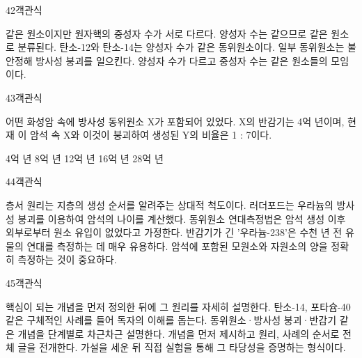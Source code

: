 \documentclass[fs9,seriesRus]{korfarm-base}
\begin{document}
\begin{kfQBlock}{42}{객관식}
\begin{kfChoices}
\kfChoice 같은 원소이지만 원자핵의 중성자 수가 서로 다르다.
\kfChoice 양성자 수는 같으므로 같은 원소로 분류된다.
\kfChoice 탄소-12와 탄소-14는 양성자 수가 같은 동위원소이다.
\kfChoice 일부 동위원소는 불안정해 방사성 붕괴를 일으킨다.
\kfChoice 양성자 수가 다르고 중성자 수는 같은 원소들의 모임이다.
\end{kfChoices}
\end{kfQBlock}
\begin{kfQBlock}{43}{객관식}
\begin{kfEvidence}어떤 화성암 속에 방사성 동위원소 X가 포함되어 있었다. X의 반감기는 4억 년이며, 현재 이 암석 속 X와 이것이 붕괴하여 생성된 Y의 비율은 1 : 7이다.\end{kfEvidence}
\begin{kfChoices}
\kfChoice 4억 년
\kfChoice 8억 년
\kfChoice 12억 년
\kfChoice 16억 년
\kfChoice 28억 년
\end{kfChoices}
\end{kfQBlock}
\begin{kfQBlock}{44}{객관식}
\begin{kfChoices}
\kfChoice 층서 원리는 지층의 생성 순서를 알려주는 상대적 척도이다.
\kfChoice 러더포드는 우라늄의 방사성 붕괴를 이용하여 암석의 나이를 계산했다.
\kfChoice 동위원소 연대측정법은 암석 생성 이후 외부로부터 원소 유입이 없었다고 가정한다.
\kfChoice 반감기가 긴 '우라늄-238'은 수천 년 전 유물의 연대를 측정하는 데 매우 유용하다.
\kfChoice 암석에 포함된 모원소와 자원소의 양을 정확히 측정하는 것이 중요하다.
\end{kfChoices}
\end{kfQBlock}
\begin{kfQBlock}{45}{객관식}
\begin{kfChoices}
\kfChoice 핵심이 되는 개념을 먼저 정의한 뒤에 그 원리를 자세히 설명한다.
\kfChoice 탄소-14, 포타슘-40 같은 구체적인 사례를 들어 독자의 이해를 돕는다.
\kfChoice 동위원소·방사성 붕괴·반감기 같은 개념을 단계별로 차근차근 설명한다.
\kfChoice 개념을 먼저 제시하고 원리, 사례의 순서로 전체 글을 전개한다.
\kfChoice 가설을 세운 뒤 직접 실험을 통해 그 타당성을 증명하는 형식이다.
\end{kfChoices}
\end{kfQBlock}
\end{document}
